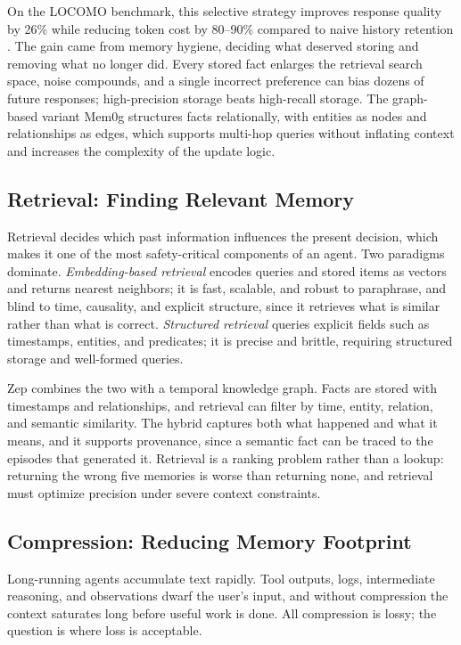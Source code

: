 \documentclass[11pt]{book}
\begin{document}
On the LOCOMO benchmark, this selective strategy improves response quality by 26\% while reducing token cost by 80--90\% compared to naive history retention \cite{mem0_2025}. The gain came from memory hygiene, deciding what deserved storing and removing what no longer did. Every stored fact enlarges the retrieval search space, noise compounds, and a single incorrect preference can bias dozens of future responses; high-precision storage beats high-recall storage. The graph-based variant Mem0g structures facts relationally, with entities as nodes and relationships as edges, which supports multi-hop queries without inflating context and increases the complexity of the update logic.

\subsection{Retrieval: Finding Relevant Memory}

Retrieval decides which past information influences the present decision, which makes it one of the most safety-critical components of an agent. Two paradigms dominate. \textit{Embedding-based retrieval} encodes queries and stored items as vectors and returns nearest neighbors; it is fast, scalable, and robust to paraphrase, and blind to time, causality, and explicit structure, since it retrieves what is similar rather than what is correct. \textit{Structured retrieval} queries explicit fields such as timestamps, entities, and predicates; it is precise and brittle, requiring structured storage and well-formed queries.

Zep \cite{rasmussen2025zep} combines the two with a temporal knowledge graph. Facts are stored with timestamps and relationships, and retrieval can filter by time, entity, relation, and semantic similarity. The hybrid captures both what happened and what it means, and it supports provenance, since a semantic fact can be traced to the episodes that generated it. Retrieval is a ranking problem rather than a lookup: returning the wrong five memories is worse than returning none, and retrieval must optimize precision under severe context constraints.

\subsection{Compression: Reducing Memory Footprint}

Long-running agents accumulate text rapidly. Tool outputs, logs, intermediate reasoning, and observations dwarf the user's input, and without compression the context saturates long before useful work is done. All compression is lossy; the question is where loss is acceptable.
\end{document}
